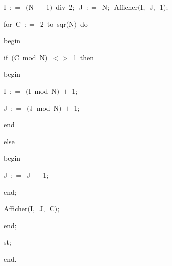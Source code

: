 {\vspace{\neglskip}\mbox{\blc  \blk\idt  I\ $:$$=$\ $($N\ $+$\ 1$)$\ \mcl div\idt \ 2$;$\ J\ $:$$=$\ N$;$\ Afficher$($I$,$\ J$,$\ 1$)$$;$}\par 
\pagebreak[3] 
\vspace{\neglskip}\mbox{\blc  \blk\idt  \mcl for\idt \ C\ $:$$=$\ 2\ \mcl to\idt \ sqr$($N$)$\ \mcl do\idt }\par 
\vspace{\neglskip}\mbox{\blc  \blk\blk\idt  \mcl begin\idt }\par 
\pagebreak[3] 
\vspace{\neglskip}\mbox{\blc  \blk\blk\blk\idt  \mcl if\idt \ $($C\ \mcl mod\idt \ N$)$\ $<$$>$\ 1\ \mcl then\idt }\par 
\vspace{\neglskip}\mbox{\blc  \blk\blk\blk\blk\idt  \mcl begin\idt }\par 
\vspace{\neglskip}\mbox{\blc  \blk\blk\blk\blk\blk\idt  I\ $:$$=$\ $($I\ \mcl mod\idt \ N$)$\ $+$\ 1$;$}\par 
\vspace{\neglskip}\mbox{\blc  \blk\blk\blk\blk\blk\idt  J\ $:$$=$\ $($J\ \mcl mod\idt \ N$)$\ $+$\ 1$;$}\par 
\vspace{\neglskip}\mbox{\blc  \blk\blk\blk\blk\idt  \mcl end\idt }\par 
\pagebreak[3] 
\vspace{\neglskip}\mbox{\blc  \blk\blk\blk\idt  \mcl else\idt }\par 
\vspace{\neglskip}\mbox{\blc  \blk\blk\blk\blk\idt  \mcl begin\idt }\par 
\vspace{\neglskip}\mbox{\blc  \blk\blk\blk\blk\blk\idt  J\ $:$$=$\ J\ $-$\ 1$;$}\par 
\vspace{\neglskip}\mbox{\blc  \blk\blk\blk\blk\idt  \mcl end\idt $;$}\par 
\vspace{\neglskip}\mbox{\blc  \blk\blk\blk\blk\blk\blk\idt  Afficher$($I$,$\ J$,$\ C$)$$;$}\par 
\vspace{\neglskip}\mbox{\blc  \blk\blk\idt  \mcl end\idt $;$}\par 
\vspace{\neglskip}\mbox{\blc  \blk\idt  st$;$}\par 
\vspace{\neglskip}\mbox{\blc  \idt  \mcl end\idt $.$}\par 

\medskip }


